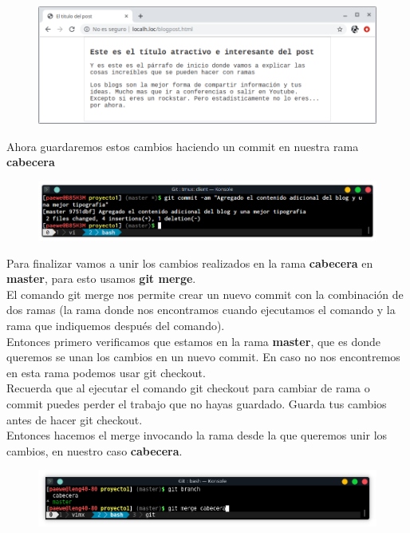 \documentclass{article}
\begin{document}
\begin{figure}[h!]
  \centering
  \includegraphics[scale=0.75]{./Pictures/154_master_web.png}
\end{figure}

Ahora guardaremos estos cambios haciendo un commit en nuestra rama
\textbf{cabecera}

\begin{figure}[h!]
  \centering
  \includegraphics[scale=0.75]{./Pictures/156_master_tipografia.png}
\end{figure}

Para finalizar vamos a unir los cambios realizados en la rama \textbf{cabecera}
en \textbf{master}, para esto usamos \textbf{git merge}.\\

El comando git merge nos permite crear un nuevo commit con la combinación de
dos ramas (la rama donde nos encontramos cuando ejecutamos el comando y la rama
que indiquemos después del comando).\\

Entonces primero verificamos que estamos en la rama \textbf{master}, que es
donde queremos se unan los cambios en un nuevo commit. En caso no nos
encontremos en esta rama podemos usar git checkout.\\

Recuerda que al ejecutar el comando git checkout para cambiar de rama o commit
puedes perder el trabajo que no hayas guardado. Guarda tus cambios antes de
hacer git checkout.\\

Entonces hacemos el merge invocando la rama desde la que queremos unir los
cambios, en nuestro caso \textbf{cabecera}.

\newpage

\begin{figure}[h!]
  \centering
  \includegraphics[scale=0.75]{./Pictures/159_git_merge_cabecera.png}
\end{figure}
\end{document}
